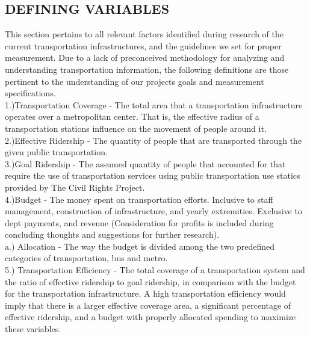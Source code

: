 \documentclass[12pt]{article}
\begin{document}
\begin{multicols}{2}
	
\section{DEFINING VARIABLES}
This section pertains to all relevant factors identified during research of the current transportation infrastructures, and the guidelines we set for proper measurement. Due to a lack of preconceived methodology for analyzing and understanding transportation information, the following definitions are those pertinent to the understanding of our projects goals and measurement specifications.\\
1.)Transportation Coverage - The total area that a transportation infrastructure operates over a metropolitan center. That is, the effective radius of a transportation stations influence on the movement of people around it.\\
2.)Effective Ridership - The quantity of people that are transported through the given public transportation.\\
3.)Goal Ridership - The assumed quantity of people that accounted for that require the use of transportation services using public transportation use statics provided by The Civil Rights Project.\\
4.)Budget - The money spent on transportation efforts. Inclusive to staff management, construction of infrastructure, and yearly extremities. Exclusive to dept payments, and revenue (Consideration for profits is included during concluding thoughts and suggestions for further research).\\
	a.) Allocation - The way the budget is divided among the two predefined categories of transportation, bus and metro.\\
5.) Transportation Efficiency - The total coverage of a transportation system and the ratio of effective ridership to goal ridership, in comparison with the budget for the transportation infrastructure. A high transportation efficiency would imply that there is a larger effective coverage area, a significant percentage of effective ridership, and a budget with properly allocated spending to maximize these variables.


\end{multicols}
\end{document}
